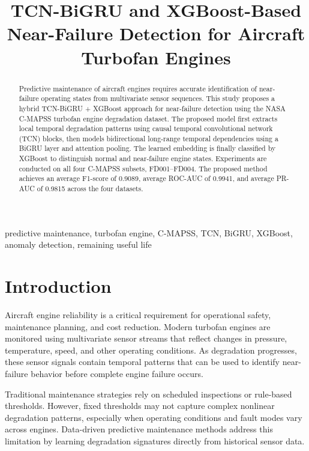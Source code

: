 \documentclass[conference]{IEEEtran}
\begin{document}
\title{TCN-BiGRU and XGBoost-Based Near-Failure Detection for Aircraft Turbofan Engines}

\author{
}

\maketitle

\begin{abstract}
Predictive maintenance of aircraft engines requires accurate identification of near-failure operating states from multivariate sensor sequences. This study proposes a hybrid TCN-BiGRU + XGBoost approach for near-failure detection using the NASA C-MAPSS turbofan engine degradation dataset. The proposed model first extracts local temporal degradation patterns using causal temporal convolutional network (TCN) blocks, then models bidirectional long-range temporal dependencies using a BiGRU layer and attention pooling. The learned embedding is finally classified by XGBoost to distinguish normal and near-failure engine states. Experiments are conducted on all four C-MAPSS subsets, FD001--FD004. The proposed method achieves an average F1-score of 0.9089, average ROC-AUC of 0.9941, and average PR-AUC of 0.9815 across the four datasets.
\end{abstract}

\begin{IEEEkeywords}
predictive maintenance, turbofan engine, C-MAPSS, TCN, BiGRU, XGBoost, anomaly detection, remaining useful life
\end{IEEEkeywords}

\section{Introduction}

Aircraft engine reliability is a critical requirement for operational safety, maintenance planning, and cost reduction. Modern turbofan engines are monitored using multivariate sensor streams that reflect changes in pressure, temperature, speed, and other operating conditions. As degradation progresses, these sensor signals contain temporal patterns that can be used to identify near-failure behavior before complete engine failure occurs.

Traditional maintenance strategies rely on scheduled inspections or rule-based thresholds. However, fixed thresholds may not capture complex nonlinear degradation patterns, especially when operating conditions and fault modes vary across engines. Data-driven predictive maintenance methods address this limitation by learning degradation signatures directly from historical sensor data.
\end{document}
